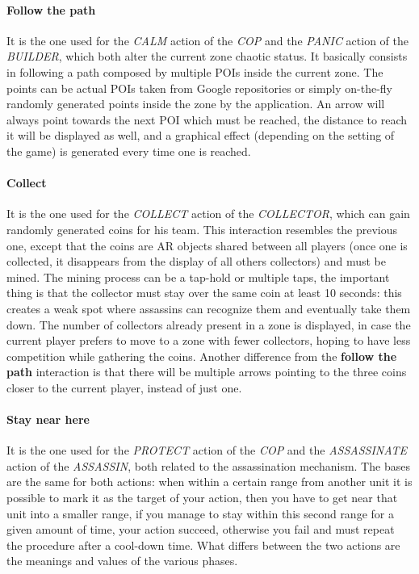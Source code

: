			{ %
			
				\paragraph{Follow the path}
				It is the one used for the \emph{CALM} action of the \emph{COP} and the \emph{PANIC} action of the \emph{BUILDER}, which both alter the current zone chaotic status.
				It basically consists in following a path composed by multiple POIs inside the current zone. The points can be actual POIs taken from Google repositories or simply on-the-fly randomly generated points inside the zone by the application.
				An arrow will always point towards the next POI which must be reached, the distance to reach it will be displayed as well, and a graphical effect (depending on the setting of the game) is generated every time one is reached.
				
				\paragraph{Collect}
				It is the one used for the \emph{COLLECT} action of the \emph{COLLECTOR}, which can gain randomly generated coins for his team.
				This interaction resembles the previous one, except that the coins are AR objects shared between all players (once one is collected, it disappears from the display of all others collectors) and must be mined. The mining process can be a tap-hold or multiple taps, the important thing is that the collector must stay over the same coin at least 10 seconds: this creates a weak spot where assassins can recognize them and eventually take them down. The number of collectors already present in a zone is displayed, in case the current player prefers to move to a zone with fewer collectors, hoping to have less competition while gathering the coins.
				Another difference from the \textbf{follow the path} interaction is that there will be multiple arrows pointing to the three coins closer to the current player, instead of just one.
				
				\paragraph{Stay near here}
				It is the one used for the \emph{PROTECT} action of the \emph{COP} and the \emph{ASSASSINATE} action of the \emph{ASSASSIN}, both related to the assassination mechanism.
				The bases are the same for both actions: when within a certain range from another unit it is possible to mark it as the target of your action, then you have to get near that unit into a smaller range, if you manage to stay within this second range for a given amount of time, your action succeed, otherwise you fail and must repeat the procedure after a cool-down time.
				What differs between the two actions are the meanings and values of the various phases.
				
}
